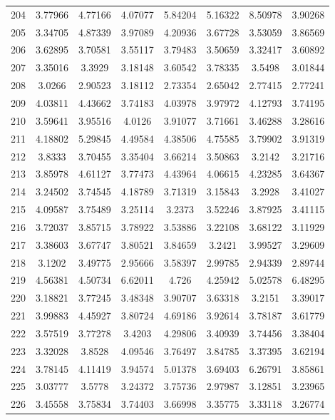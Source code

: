 \begin{figure}
\begin{tabular}{cccccccc}
204 & 3.77966 & 4.77166 & 4.07077 & 5.84204 & 5.16322 & 8.50978 & 3.90268\\
205 & 3.34705 & 4.87339 & 3.97089 & 4.20936 & 3.67728 & 3.53059 & 3.86569\\
206 & 3.62895 & 3.70581 & 3.55117 & 3.79483 & 3.50659 & 3.32417 & 3.60892\\
207 & 3.35016 & 3.3929 & 3.18148 & 3.60542 & 3.78335 & 3.5498 & 3.01844\\
208 & 3.0266 & 2.90523 & 3.18112 & 2.73354 & 2.65042 & 2.77415 & 2.77241\\
209 & 4.03811 & 4.43662 & 3.74183 & 4.03978 & 3.97972 & 4.12793 & 3.74195\\
210 & 3.59641 & 3.95516 & 4.0126 & 3.91077 & 3.71661 & 3.46288 & 3.28616\\
211 & 4.18802 & 5.29845 & 4.49584 & 4.38506 & 4.75585 & 3.79902 & 3.91319\\
212 & 3.8333 & 3.70455 & 3.35404 & 3.66214 & 3.50863 & 3.2142 & 3.21716\\
213 & 3.85978 & 4.61127 & 3.77473 & 4.43964 & 4.06615 & 4.23285 & 3.64367\\
214 & 3.24502 & 3.74545 & 4.18789 & 3.71319 & 3.15843 & 3.2928 & 3.41027\\
215 & 4.09587 & 3.75489 & 3.25114 & 3.2373 & 3.52246 & 3.87925 & 3.41115\\
216 & 3.72037 & 3.85715 & 3.78922 & 3.53886 & 3.22108 & 3.68122 & 3.11929\\
217 & 3.38603 & 3.67747 & 3.80521 & 3.84659 & 3.2421 & 3.99527 & 3.29609\\
218 & 3.1202 & 3.49775 & 2.95666 & 3.58397 & 2.99785 & 2.94339 & 2.89744\\
219 & 4.56381 & 4.50734 & 6.62011 & 4.726 & 4.25942 & 5.02578 & 6.48295\\
220 & 3.18821 & 3.77245 & 3.48348 & 3.90707 & 3.63318 & 3.2151 & 3.39017\\
221 & 3.99883 & 4.45927 & 3.80724 & 4.69186 & 3.92614 & 3.78187 & 3.61779\\
222 & 3.57519 & 3.77278 & 3.4203 & 4.29806 & 3.40939 & 3.74456 & 3.38404\\
223 & 3.32028 & 3.8528 & 4.09546 & 3.76497 & 3.84785 & 3.37395 & 3.62194\\
224 & 3.78145 & 4.11419 & 3.94574 & 5.01378 & 3.69403 & 6.26791 & 3.85861\\
225 & 3.03777 & 3.5778 & 3.24372 & 3.75736 & 2.97987 & 3.12851 & 3.23965\\
226 & 3.45558 & 3.75834 & 3.74403 & 3.66998 & 3.35775 & 3.33118 & 3.26774\\

\end{tabular}
\end{figure}

